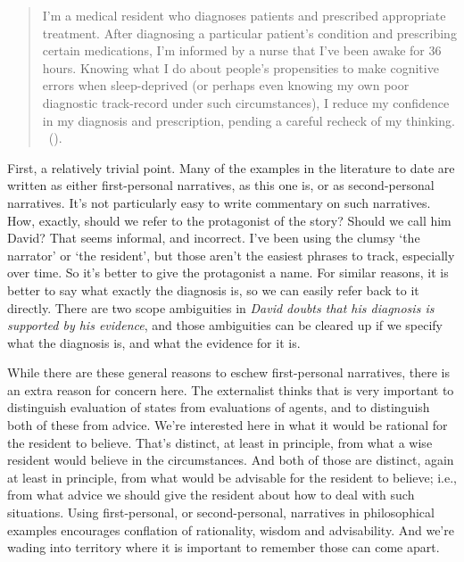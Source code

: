\documentclass[
  10pt,
  letterpaper,
  twoside]{scrbook}
\begin{document}
\begin{quote}
I'm a medical resident who diagnoses patients and prescribed appropriate
treatment. After diagnosing a particular patient's condition and
prescribing certain medications, I'm informed by a nurse that I've been
awake for 36 hours. Knowing what I do about people's propensities to
make cognitive errors when sleep-deprived (or perhaps even knowing my
own poor diagnostic track-record under such circumstances), I reduce my
confidence in my diagnosis and prescription, pending a careful recheck
of my thinking. ~().
\end{quote}

First, a relatively trivial point. Many of the examples in the
literature to date are written as either first-personal narratives, as
this one is, or as second-personal narratives. It's not particularly
easy to write commentary on such narratives. How, exactly, should we
refer to the protagonist of the story? Should we call him David? That
seems informal, and incorrect. I've been using the clumsy `the narrator'
or `the resident', but those aren't the easiest phrases to track,
especially over time. So it's better to give the protagonist a name. For
similar reasons, it is better to say what exactly the diagnosis is, so
we can easily refer back to it directly. There are two scope ambiguities
in \emph{David doubts that his diagnosis is supported by his evidence},
and those ambiguities can be cleared up if we specify what the diagnosis
is, and what the evidence for it is.

While there are these general reasons to eschew first-personal
narratives, there is an extra reason for concern here. The externalist
thinks that is very important to distinguish evaluation of states from
evaluations of agents, and to distinguish both of these from advice.
We're interested here in what it would be rational for the resident to
believe. That's distinct, at least in principle, from what a wise
resident would believe in the circumstances. And both of those are
distinct, again at least in principle, from what would be advisable for
the resident to believe; i.e., from what advice we should give the
resident about how to deal with such situations. Using first-personal,
or second-personal, narratives in philosophical examples encourages
conflation of rationality, wisdom and advisability. And we're wading
into territory where it is important to remember those can come apart.
\end{document}
